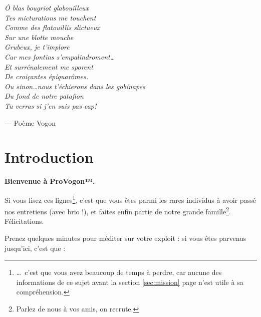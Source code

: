 \newcommand{\provogon}{ProVogon™}

\vspace{-1cm}

\noindent\emph{Ô blas bougriot glabouilleux\\
Tes micturations me touchent\\
Comme des flatouillis slictueux\\
Sur une blotte mouche\\
Grubeux, je t'implore\\
Car mes fontins s'empalindroment\ldots\\
Et surrénalement me sporent\\
De croiçantes épiquarômes.\\
Ou sinon\ldots nous t'échierons dans les gobinapes\\
Du fond de notre patafion\\
Tu verras si j'en suis pas cap!
}

\vspace{1cm}

\hspace{5cm} --- Poème Vogon

\newpage

\section{Introduction}

\textbf{Bienvenue à \provogon{}.}

Si vous lisez ces lignes\footnote{\ldots~c'est que vous avez
beaucoup de temps à perdre, car aucune des informations de ce sujet avant la
section \ref{sec:mission} page \pageref{sec:mission} n'est utile à sa
compréhension.},
c'est que vous êtes parmi les rares individus à avoir passé nos entretiens
(avec brio !), et faites enfin partie de notre grande famille\footnote{Parlez
de nous à vos amis, on recrute.}. Félicitations.

Prenez quelques minutes pour méditer sur votre exploit : si vous êtes parvenus
jusqu'ici, c'est que :


